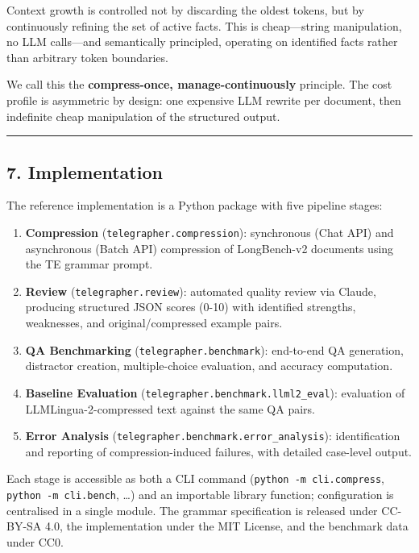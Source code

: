 \documentclass[
]{article}
\providecommand{\tightlist}{%
  \setlength{\itemsep}{0pt}\setlength{\parskip}{0pt}}
\begin{document}
Context growth is controlled not by discarding the oldest tokens, but by
continuously refining the set of active facts. This is cheap---string
manipulation, no LLM calls---and semantically principled, operating on
identified facts rather than arbitrary token boundaries.

We call this the \textbf{compress-once, manage-continuously} principle.
The cost profile is asymmetric by design: one expensive LLM rewrite per
document, then indefinite cheap manipulation of the structured output.

\begin{center}\rule{0.5\linewidth}{0.5pt}\end{center}

\subsection{7. Implementation}\label{implementation}

The reference implementation is a Python package with five pipeline
stages:

\begin{enumerate}
\def\labelenumi{\arabic{enumi}.}
\tightlist
\item
  \textbf{Compression} (\texttt{telegrapher.compression}): synchronous
  (Chat API) and asynchronous (Batch API) compression of LongBench-v2
  documents using the TE grammar prompt.
\item
  \textbf{Review} (\texttt{telegrapher.review}): automated quality
  review via Claude, producing structured JSON scores (0-10) with
  identified strengths, weaknesses, and original/compressed example
  pairs.
\item
  \textbf{QA Benchmarking} (\texttt{telegrapher.benchmark}): end-to-end
  QA generation, distractor creation, multiple-choice evaluation, and
  accuracy computation.
\item
  \textbf{Baseline Evaluation}
  (\texttt{telegrapher.benchmark.llml2\_eval}): evaluation of
  LLMLingua-2-compressed text against the same QA pairs.
\item
  \textbf{Error Analysis}
  (\texttt{telegrapher.benchmark.error\_analysis}): identification and
  reporting of compression-induced failures, with detailed case-level
  output.
\end{enumerate}

Each stage is accessible as both a CLI command
(\texttt{python\ -m\ cli.compress}, \texttt{python\ -m\ cli.bench},
\ldots) and an importable library function; configuration is centralised
in a single module. The grammar specification is released under CC-BY-SA
4.0, the implementation under the MIT License, and the benchmark data
under CC0.
\end{document}
